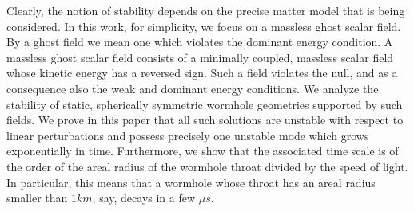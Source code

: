 \documentclass[           %
               showpacs,            %
               preprintnumbers,     %
               aps,                 %
               prd,                 %
               superscriptaddress,      %
               nofootinbib,         %
               tightenlines,        %
               floats,floatfix      %
               ]{revtex4}
\begin{document}
Clearly, the notion of stability depends on the precise matter model
that is being considered. In this work, for simplicity, we focus on a
massless ghost scalar field. By a ghost field we mean one which
violates the dominant energy condition. A massless ghost scalar field
consists of a minimally coupled, massless scalar field whose kinetic
energy has a reversed sign. Such a field violates the null, and as a
consequence also the weak and dominant energy conditions. We analyze
the stability of static, spherically symmetric wormhole geometries
supported by such fields. We prove in this paper that all such
solutions are unstable with respect to linear perturbations and
possess precisely one unstable mode which grows exponentially in
time. Furthermore, we show that the associated time scale is of the
order of the areal radius of the wormhole throat divided by the speed
of light. In particular, this means that a wormhole whose throat has
an areal radius smaller than $1km$, say, decays in a few $\mu s$.
\end{document}
